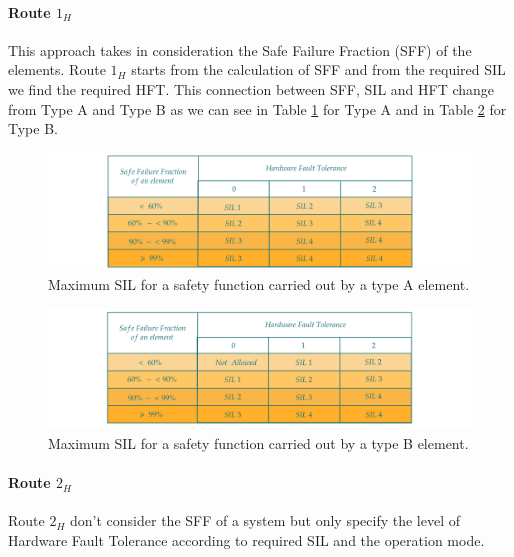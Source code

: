 {{{{		        \paragraph{Route $1_H$}{
		            This approach takes in consideration the Safe Failure Fraction (SFF) of the elements. Route $1_H$ starts from the calculation of SFF and from the required SIL we find the required HFT. This connection between SFF, SIL and HFT change from Type A and Type B as we can see in Table \ref{fig:TypeASIL} for Type A and in Table  \ref{fig:TypeBSIL} for Type B.
		            \begin{figure}[H]
        				\centering
        				\includegraphics[scale=0.2,center]{./images/TypeASILTable.png}
        				\caption{Maximum SIL for a safety function carried out by a type A element.}
    			    	\label{fig:TypeASIL}
    			    \end{figure} 
		            \begin{figure}[H]
        				\centering
        				\includegraphics[scale=0.2,center]{./images/TypeBSILTable.png}
        				\caption{Maximum SIL for a safety function carried out by a type B element.}
    			    	\label{fig:TypeBSIL}
    			    \end{figure} 
    			    
		        }
		        \paragraph{Route $2_H$}{
		               Route $2_H$ don't consider the SFF of a system but only specify the level of Hardware Fault Tolerance according to required SIL and the operation mode.
		               
		               
		        }
		        
}}}}
